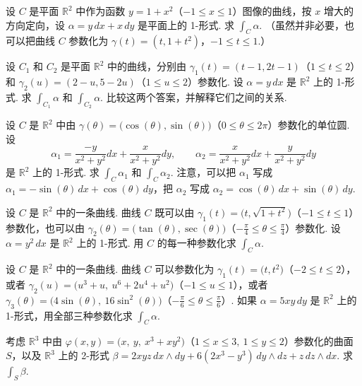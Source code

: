 \begin{question}\label{q:7-17}
设 $C$ 是平面 $\mathbb{R}^2$ 中作为函数 $y=1+x^2$（$-1\leq x\leq 1$）图像的曲线，按 $x$ 增大的方向定向，设 $\alpha=y\,dx+x\,dy$ 是平面上的 1-形式. 求 $\int_C\alpha$. （虽然并非必要，也可以把曲线 $C$ 参数化为 $\gamma(t)=(t,1+t^2)$，$-1\leq t\leq 1$.）
\end{question}

\begin{question}\label{q:7-18}
设 $C_1$ 和 $C_2$ 是平面 $\mathbb{R}^2$ 中的曲线，分别由 $\gamma_1(t)=(t-1,2t-1)$（$1\leq t\leq 2$）和 $\gamma_2(u)=(2-u,5-2u)$（$1\leq u\leq 2$）参数化. 设 $\alpha=y\,dx$ 是 $\mathbb{R}^2$ 上的 1-形式. 求 $\int_{C_1}\alpha$ 和 $\int_{C_2}\alpha$. 比较这两个答案，并解释它们之间的关系.
\end{question}

\begin{question}\label{q:7-19}
设 $C$ 是 $\mathbb{R}^2$ 中由 $\gamma(\theta)=\bigl(\cos(\theta),\sin(\theta)\bigr)$（$0\leq\theta\leq 2\pi$）参数化的单位圆. 设
\[
\alpha_1=\frac{-y}{x^2+y^2}dx+\frac{x}{x^2+y^2}dy,\qquad
\alpha_2=\frac{x}{x^2+y^2}dx+\frac{y}{x^2+y^2}dy
\]
是 $\mathbb{R}^2$ 上的 1-形式. 求 $\int_C\alpha_1$ 和 $\int_C\alpha_2$. 注意，可以把 $\alpha_1$ 写成 $\alpha_1=-\sin(\theta)\,dx+\cos(\theta)\,dy$，把 $\alpha_2$ 写成 $\alpha_2=\cos(\theta)\,dx+\sin(\theta)\,dy$.
\end{question}

\begin{question}\label{q:7-20}
设 $C$ 是 $\mathbb{R}^2$ 中的一条曲线. 曲线 $C$ 既可以由 $\gamma_1(t)=\bigl(t,\sqrt{1+t^2}\bigr)$（$-1\leq t\leq 1$）参数化，也可以由 $\gamma_2(\theta)=\bigl(\tan(\theta),\sec(\theta)\bigr)$（$-\frac{\pi}{4}\leq\theta\leq\frac{\pi}{4}$）参数化. 设 $\alpha=y^2\,dx$ 是 $\mathbb{R}^2$ 上的 1-形式. 用 $C$ 的每一种参数化求 $\int_C\alpha$.
\end{question}

\begin{question}\label{q:7-21}
设 $C$ 是 $\mathbb{R}^2$ 中的一条曲线. 曲线 $C$ 可以参数化为 $\gamma_1(t)=\bigl(t,t^2\bigr)$（$-2\leq t\leq 2$），或者 $\gamma_2(u)=\bigl(u^3+u,\ u^6+2u^4+u^2\bigr)$（$-1\leq u\leq 1$），或者 $\gamma_3(\theta)=\bigl(4\sin(\theta),\ 16\sin^2(\theta)\bigr)$（$-\frac{\pi}{6}\leq\theta\leq\frac{\pi}{6}$）. 如果 $\alpha=5xy\,dy$ 是 $\mathbb{R}^2$ 上的 1-形式，用全部三种参数化求 $\int_C\alpha$.
\end{question}

\begin{question}\label{q:7-22}
考虑 $\mathbb{R}^3$ 中由 $\varphi(x,y)=\bigl(x,\ y,\ x^3+xy^2\bigr)$（$1\leq x\leq 3,\ 1\leq y\leq 2$）参数化的曲面 $S$，以及 $\mathbb{R}^3$ 上的 2-形式 $\beta=2xyz\,dx\wedge dy+6(2x^3-y^3)\,dy\wedge dz+z\,dz\wedge dx$. 求 $\int_S\beta$.
\end{question}

